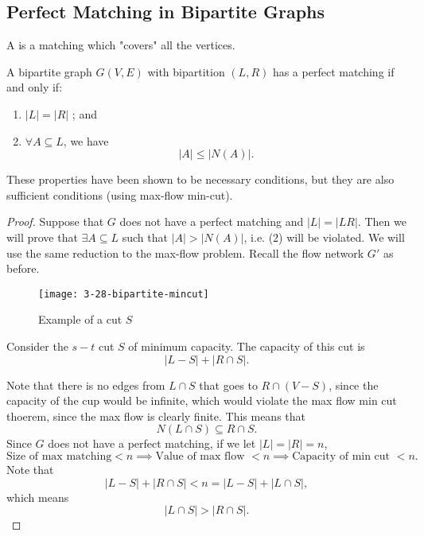 \documentclass[../main/main.tex]{subfiles}
\begin{document}
	\subsection{Perfect Matching in Bipartite Graphs}

\begin{definition}
	A  is a matching which "covers" all the vertices.
\end{definition}
\begin{theorem}
	A bipartite graph $G(V,E)$ with bipartition $\left( L,R \right) $ has a perfect matching if and only if: 
	\begin{enumerate}
		\item $|L|=|R|$ ; and 
		\item $\forall A\subseteq L$, we have \[
				|A|\le |N(A)|
		.\]  
	\end{enumerate}
	These properties have been shown to be necessary conditions, but they are also sufficient conditions (using max-flow min-cut).
\end{theorem}

\begin{proof}
	Suppose that $G$ does not have a perfect matching and  $|L|=|LR|$. Then we will prove that  $\exists A\subseteq L$ such that $|A|>|N(A)|$, i.e. (2) will be violated. We will use the same reduction to the max-flow problem. Recall the flow network $G'$ as before.
	\begin{figure}[h!]
		\centering
		\texttt{[image: 3-28-bipartite-mincut]}
		\caption{Example of a cut $S$}
		\label{fig:}
	\end{figure}

	Consider the $s-t$ cut $S$ of minimum capacity. The capacity of this cut is \[
	|L-S|+|R\cap S|
	.\] 

	Note that there is no edges from $L\cap S$ that goes to $R\cap (V-S)$, since the capacity of the cup would be infinite, which would violate the max flow min cut thoerem, since the max flow is clearly finite. This means that  \[
		N(L\cap S)\subseteq R\cap S
	.\]
	Since $G$ does not have a perfect matching, if we let $|L|=|R|=n$,  \[
	\text{Size of max matching}<n \implies \text{Value of max flow }< n\implies \text{Capacity of min cut }<n 
	.\] 
	Note that \[
	|L-S|+|R\cap S|<n=|L-S|+|L\cap S|
	,\] which means \[
	|L\cap S|>|R\cap S| 
	.\]  
\end{proof}
\end{document}
